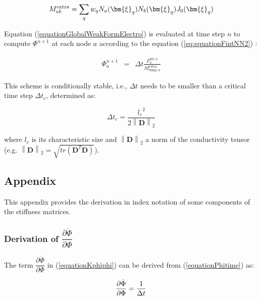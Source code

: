 \documentclass[oneside,11pt,times]{book}
\begin{document}
\begin{equation}
\begin{aligned}
\centering
M_{ab}^{\text{extra}}=\sum_q w_q N_a(\bm{\xi}_q) N_b(\bm{\xi}_q) J_0(\bm{\xi}_q)
\end{aligned}
\label{equationMassMatExp}
\end{equation}

Equation (\ref{equationGlobalWeakFormElectro}) is evaluated at time step $n$ to compute $\Phi^{n+1}$ at each node $a$ according to the equation (\ref{eq:equationFintNN2}) :

\begin{eqnarray}
\Phi^{n+1}_a & = & \Delta t \frac{F^{\text{int},n}_a}{M_{\text{lump},a}^{\text{extra}}}\label{eq:PhiNNExp1}
\end{eqnarray}

This scheme is conditionally stable, i.e., $\Delta t$ needs to be smaller than a critical time step $\Delta t_c$, determined as:

\begin{equation}
  \Delta t_c = \frac{{l_e}^2}{2 \left\lVert \bm{D}\right\rVert_2}
\end{equation}

where $l_e$ is its characteristic size and $\left\lVert \bm{D}\right\rVert_2$ a norm of the conductivity tensor (e.g. $\left\lVert \bm{D}\right\rVert_2 = \sqrt{tr(\bm{D}^T \bm{D})}$).

\subsection{Appendix}
This appendix provides the derivation in index notation of some components of the stiffness matrices.

\subsubsection{Derivation of $\dfrac{\partial{\dot{\Phi}}}{\partial{\Phi}}$}

The term $\dfrac{\partial{\dot{\Phi}}}{\partial{\Phi}}$ in (\ref{equationKphiphi}) can be derived from (\ref{equationPhitime}) as:

\begin{equation}
\begin{aligned}
\centering
\dfrac{\partial{\dot{\Phi}}}{\partial{\Phi}}=\dfrac{1}{\Delta t}
\end{aligned}
\label{equationdPhiTimedPhi}
\end{equation}
\end{document}
